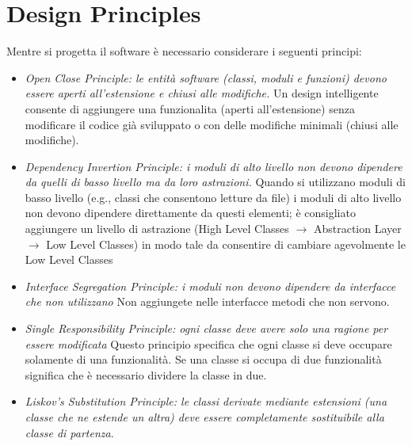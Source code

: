 \documentclass{article}
\begin{document}
\maketitle



\newpage
\tableofcontents
\newpage

\section{Design Principles}
Mentre si progetta il software \`e necessario considerare i seguenti principi:
\begin{itemize}
\item \emph{Open Close Principle: le entit\`a software (classi, moduli e funzioni) devono essere aperti all'estensione e chiusi alle modifiche.}
Un design intelligente consente di aggiungere una funzionalita (aperti all'estensione) senza modificare il codice gi\`a sviluppato o con delle modifiche minimali (chiusi alle modifiche).
\item \emph{Dependency Invertion Principle: i moduli di alto livello non devono dipendere da quelli di basso livello ma da loro astrazioni.}
Quando si utilizzano moduli di basso livello (e.g., classi che consentono letture da file) i moduli di alto livello non devono dipendere direttamente da questi elementi; \`e consigliato aggiungere un livello di astrazione (High Level Classes $\rightarrow$ Abstraction Layer $\rightarrow$ Low Level Classes) in modo tale da consentire di cambiare agevolmente le Low Level Classes
\item \emph{Interface Segregation Principle: i moduli non devono dipendere da interfacce che non utilizzano} Non aggiungete nelle interfacce metodi che non servono.
\item \emph{Single Responsibility Principle: ogni classe deve avere solo una ragione per essere modificata} 
Questo principio specifica che ogni classe si deve occupare solamente di una funzionalit\`a. 
Se una classe si occupa di due funzionalit\`a significa che \`e necessario dividere la classe in due.
\item \emph{Liskov's Substitution Principle: le classi derivate mediante estensioni (una classe che ne estende un altra) deve essere completamente sostituibile alla classe di partenza}.
 
\end{itemize}
\end{document}
